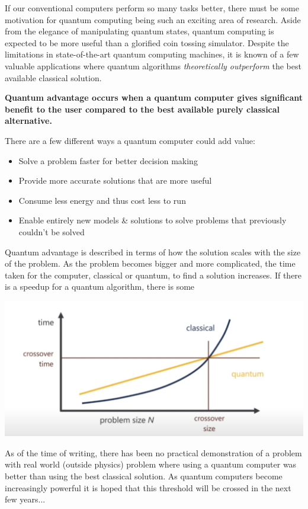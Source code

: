 \documentclass{book}
\begin{document}
If our conventional computers perform so many tasks better, there must be some motivation for quantum computing being such an exciting area of research. Aside from the elegance of manipulating quantum states, quantum computing is expected to be more useful than a glorified coin tossing simulator. Despite the limitations in state-of-the-art quantum computing machines, it is known of a few valuable applications where quantum algorithms \textit{theoretically outperform} the best available classical solution.

\textbf{Quantum advantage occurs when a quantum computer gives significant benefit to the user compared to the best available purely classical alternative.} 

There are a few different ways a quantum computer could add value: 

\begin{itemize}
    \item Solve a problem faster for better decision making
    \item Provide more accurate solutions that are more useful 
    \item Consume less energy and thus cost less to run 
    \item Enable entirely new models \& solutions to solve problems that previously couldn't be solved
\end{itemize}

    
Quantum advantage is described in terms of how the solution scales with the size of the problem. As the problem becomes bigger and more complicated, the time taken for the computer, classical or quantum, to find a solution increases. If there is a speedup for a quantum algorithm, there is some 

\includegraphics[scale = 0.5]{images/Q_advantage.png}

As of the time of writing, there has been no practical demonstration of a problem with real world (outside physics) problem where using a quantum computer was better than using the best classical solution. As quantum computers become increasingly powerful it is hoped that this threshold will be crossed in the next few years...
\end{document}
